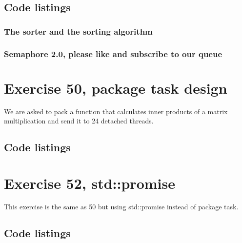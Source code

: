 \documentclass[11pt]{article}
\begin{document}
\subsection*{Code listings}




\subsubsection*{The sorter and the sorting algorithm}



\subsubsection*{Semaphore 2.0, please like and subscribe to our queue}











\section*{Exercise 50, package task design}
We are asked to pack a function that calculates inner products of a matrix multiplication and send it to 24 detached threads.

\subsection*{Code listings}



\section*{Exercise 52, std::promise}
This exercise is the same as 50 but using std::promise instead of package task.

\subsection*{Code listings}

\end{document}

